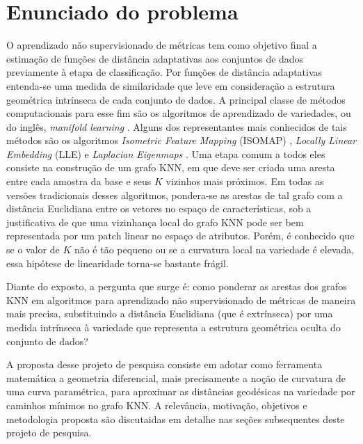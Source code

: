 \documentclass[a4paper,12pt]{article}
\begin{document}
\section{Enunciado do problema}
\noindent
O aprendizado não supervisionado de métricas tem como objetivo final a estimação de funções de distância adaptativas aos conjuntos de dados previamente à etapa de classificação. Por funções de distância adaptativas entenda-se uma medida de similaridade que leve em consideração a estrutura geométrica intrínseca de cada conjunto de dados. A principal classe de métodos computacionais para esse fim são os algoritmos de aprendizado de variedades, ou do inglês, \emph{manifold learning} \cite{Seung,Brand,Cayton,Huo2007,Advances,Diffusion1}. Alguns dos representantes mais conhecidos de tais métodos são os algoritmos \emph{Isometric Feature Mapping} (ISOMAP) \cite{Isomap,Isomap_converg}, \emph{Locally Linear Embedding} (LLE) \cite{LLE,LLE2,LLE3,LLE4, LLE5} e \emph{Laplacian Eigenmaps} \cite{LapEig,SurveyLE}. Uma etapa comum a todos eles consiste na construção de um grafo KNN, em que deve ser criada uma aresta entre cada amostra da base e seus $K$ vizinhos mais próximos. Em todas as versões tradicionais desses algoritmos, pondera-se as arestas de tal grafo com a distância Euclidiana entre os vetores no espaço de características, sob a justificativa de que uma vizinhança local do grafo KNN pode ser bem representada por um patch linear no espaço de atributos. Porém, é conhecido que se o valor de $K$ não é tão pequeno ou se a curvatura local na variedade é elevada, essa hipótese de linearidade torna-se bastante frágil.

Diante do exposto, a pergunta que surge é: como ponderar as arestas dos grafos KNN em algoritmos para aprendizado não supervisionado de métricas de maneira mais precisa, substituindo a distância Euclidiana (que é extrínseca) por uma medida intrínseca à variedade que representa a estrutura geométrica oculta do conjunto de dados?

A proposta desse projeto de pesquisa consiste em adotar como ferramenta matemática a geometria diferencial, mais precisamente a noção de curvatura de uma curva paramétrica, para aproximar as distâncias geodésicas na variedade por caminhos mínimos no grafo KNN. A relevância, motivação, objetivos e metodologia proposta são discutaidas em detalhe nas seções subsequentes deste projeto de pesquisa.
\end{document}
